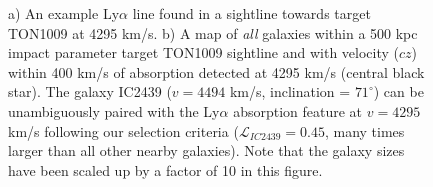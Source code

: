 \documentclass[12pt]{article}
\begin{document}
\begin{figure}[ht!]
\begin{subfigure}[t]{0.5\textwidth}
        \caption{}
    \end{subfigure}
  \caption{\small{a) An example Ly$\alpha$ line found in a sightline towards target TON1009 at 4295 km/s. b) A map of \textit{all} galaxies within a 500 kpc impact parameter target TON1009 sightline and with velocity ($cz$) within 400 km/s of absorption detected at 4295 km/s (central black star). The galaxy IC2439 ($v=4494$ km/s, inclination = $71^{\circ}$) can be unambiguously paired with the Ly$\alpha$ absorption feature at $v=4295$ km/s following our selection criteria ($\mathcal{L}_{IC2439} = 0.45$, many times larger than all other nearby galaxies). Note that the galaxy sizes have been scaled up by a factor of 10 in this figure.}}
  \label{line}
\end{figure}
\end{document}
